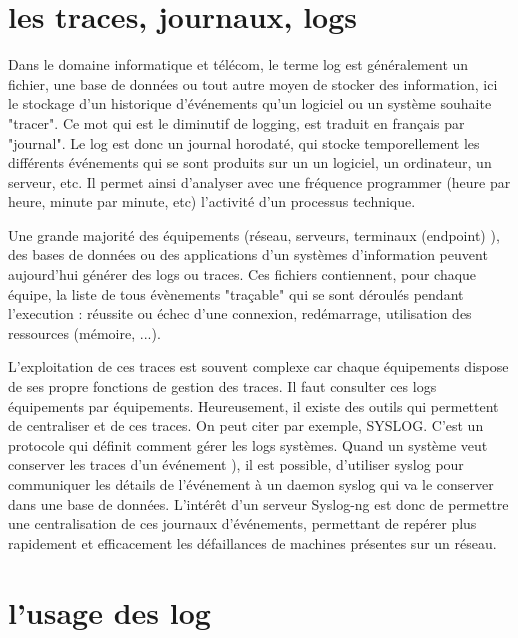 
\section{les traces, journaux, logs}

Dans le domaine informatique et télécom, le terme log est généralement un fichier, une base de données ou tout autre moyen de stocker des information, ici le stockage d'un historique d'événements qu'un logiciel ou un système souhaite "tracer". Ce mot qui est le diminutif  de logging, est traduit en français par "journal". Le log est donc un journal horodaté, qui stocke temporellement les différents événements qui se sont produits sur un un logiciel, un ordinateur, un serveur, etc. Il permet ainsi d'analyser avec une fréquence programmer (heure par heure,  minute par minute, etc) l'activité  d'un processus technique.


Une grande majorité des équipements (réseau, serveurs, terminaux (endpoint) ), des bases de données ou des applications d’un systèmes d'information peuvent aujourd’hui générer des logs ou traces.  Ces fichiers contiennent, pour chaque équipe, la liste de tous évènements  "traçable" qui se sont déroulés pendant l'execution : réussite ou échec d’une connexion, redémarrage, utilisation des ressources (mémoire, ...).


L'exploitation de ces traces est souvent complexe car chaque équipements dispose de ses propre fonctions de gestion des traces. Il faut consulter ces logs équipements par équipements. Heureusement, il existe des outils qui permettent de centraliser et de  ces traces.
On peut citer par exemple, SYSLOG. 
C'est un protocole qui définit comment gérer les logs systèmes. Quand un système veut conserver les traces d'un événement ),  il est possible, d'utiliser syslog pour communiquer les détails de l'événement à un daemon syslog qui va le conserver dans une base de données.
L'intérêt d'un serveur Syslog-ng est donc de permettre une centralisation de ces journaux d'événements, permettant de repérer plus rapidement et efficacement les défaillances de machines présentes sur un réseau.


 \section{l'usage des log}
 
